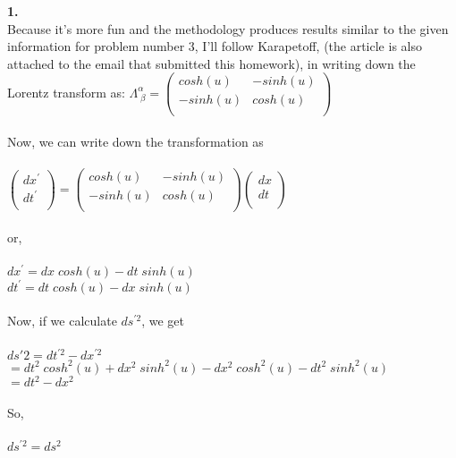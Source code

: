 \documentclass[prb,preprint]
{revtex4-1}
\begin{document}
\textbf{1.}
\\
Because it's more fun and the methodology produces results similar to the given information for problem number 3, I'll follow Karapetoff\cite{karapetoff1}, (the article is also attached to the email that submitted this homework), in writing down the Lorentz transform as:
$\Lambda^\alpha_{\;\beta} = \begin{pmatrix}
cosh\left(u\right) & -sinh\left(u\right)\\
-sinh\left(u\right) & cosh\left(u\right)\\
\end{pmatrix} 
 $
\\
\\
Now, we can write down the transformation as 
\\
\\
$\begin{pmatrix}
dx^\prime\\
dt^\prime\\
\end{pmatrix} = \begin{pmatrix}
cosh\left(u\right) & -sinh\left(u\right)\\
-sinh\left(u\right) & cosh\left(u\right)\\
\end{pmatrix} 
\begin{pmatrix}
dx\\
dt\\
\end{pmatrix}
 $
\\
\\
or, 
\\
\\
$dx^\prime = dx\;cosh\left(u\right) - dt\;sinh\left(u\right)$
\\
$dt^\prime = dt\;cosh\left(u\right) - dx\;sinh\left(u\right)$
\\
\\
Now, if we calculate $ds^{\prime 2}$, we get
\\
\\
$ds{\prime 2} = dt^{\prime 2} - dx^{\prime 2}$
\\
$= dt^2\;cosh^2\left(u\right) + dx^2\;sinh^2\left(u\right) - dx^2\;cosh^2\left(u\right) - dt^2\;sinh^2\left(u\right)$
\\
$= dt^2 - dx^2$
\\
\\
So,
\\
\\
$ds^{\prime 2} = ds^2$
\\
\end{document}
